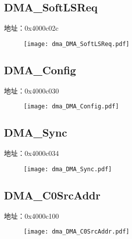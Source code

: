 \subsection{DMA\_SoftLSReq}
\label{dma-DMA-SoftLSReq}
地址：0x4000c02c
 \begin{figure}[H]
\texttt{[image: dma\_DMA\_SoftLSReq.pdf]}
\end{figure}

\subsection{DMA\_Config}
\label{dma-DMA-Config}
地址：0x4000c030
 \begin{figure}[H]
\texttt{[image: dma\_DMA\_Config.pdf]}
\end{figure}

\subsection{DMA\_Sync}
\label{dma-DMA-Sync}
地址：0x4000c034
 \begin{figure}[H]
\texttt{[image: dma\_DMA\_Sync.pdf]}
\end{figure}

\subsection{DMA\_C0SrcAddr}
\label{dma-DMA-C0SrcAddr}
地址：0x4000c100
 \begin{figure}[H]
\texttt{[image: dma\_DMA\_C0SrcAddr.pdf]}
\end{figure}


